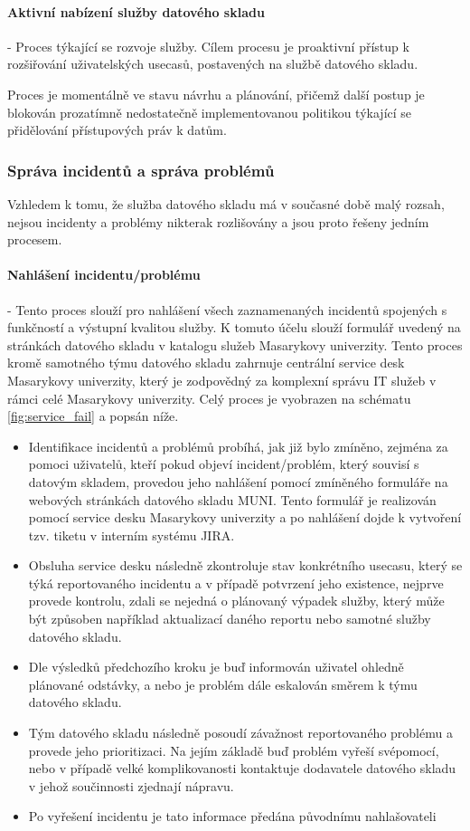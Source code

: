 \documentclass[
  digital,     %
  twoside,     %
  lof,         %
  lot,         %
]{fithesis4}
\begin{document}
\paragraph{Aktivní nabízení služby datového skladu} - Proces týkající se rozvoje služby. Cílem procesu je proaktivní přístup k rozšiřování uživatelských usecasů, postavených na službě datového skladu.

Proces je momentálně ve stavu návrhu a plánování, přičemž další postup je blokován prozatímně nedostatečně implementovanou politikou týkající se přidělování přístupových práv k datům.

\subsubsection{Správa incidentů a správa problémů}
Vzhledem k tomu, že služba datového skladu má v současné době malý rozsah, nejsou incidenty a problémy nikterak rozlišovány a jsou proto řešeny jedním procesem. 

\paragraph{Nahlášení incidentu/problému} - Tento proces slouží pro nahlášení všech zaznamenaných incidentů spojených s funkčností a výstupní kvalitou služby. K tomuto účelu slouží formulář uvedený na stránkách datového skladu v katalogu služeb Masarykovy univerzity. Tento proces kromě samotného týmu datového skladu zahrnuje centrální service desk Masarykovy univerzity, který je zodpovědný za komplexní správu IT služeb v rámci celé Masarykovy univerzity. Celý proces je vyobrazen na schématu \ref{fig:service_fail} a popsán níže.
    \begin{itemize}
        \item Identifikace incidentů a problémů probíhá, jak již bylo zmíněno, zejména za pomoci uživatelů, kteří pokud objeví incident/problém, který souvisí s datovým skladem, provedou jeho nahlášení pomocí zmíněného formuláře na webových stránkách datového skladu MUNI. Tento formulář je realizován pomocí service desku Masarykovy univerzity a po nahlášení dojde k vytvoření tzv. tiketu v interním systému JIRA. 
        \item Obsluha service desku následně zkontroluje stav konkrétního usecasu, který se týká reportovaného incidentu a v případě potvrzení jeho existence, nejprve provede kontrolu, zdali se nejedná o plánovaný výpadek služby, který může být způsoben například aktualizací daného reportu nebo samotné služby datového skladu. 
        \item Dle výsledků předchozího kroku je buď informován uživatel ohledně plánované odstávky, a nebo je problém dále eskalován směrem k týmu datového skladu. 
        \item Tým datového skladu následně posoudí závažnost reportovaného problému a provede jeho prioritizaci. Na jejím základě buď problém vyřeší svépomocí, nebo v případě velké komplikovanosti kontaktuje dodavatele datového skladu v jehož součinnosti zjednají nápravu. 
        \item Po vyřešení incidentu je tato informace předána původnímu nahlašovateli
    \end{itemize}
        
\end{document}
